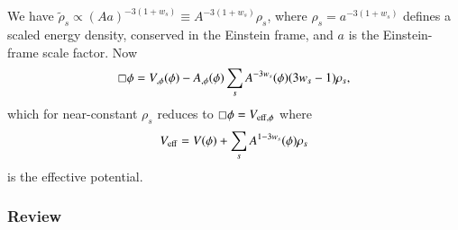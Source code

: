     We have $\widetilde{\rho}_s\propto (Aa)^{-3(1+w_s)} \equiv A^{-3(1+w_s)}\rho_s$, where $\rho_s=a^{-3(1+w_s)}$ defines a scaled energy density, conserved in the Einstein frame, and $a$ is the Einstein-frame scale factor. Now
    \begin{equation}
        \sq \phi = V_{,\phi}(\phi) - A_{,\phi}(\phi) \sum_{s} A^{-3w_s}(\phi) (3w_s-1)\rho_s,
    \end{equation}
    which for near-constant $\rho_s$ reduces to $\sq \phi = V_{\mathrm{eff},\phi}$ where~\citep{hinterbichlerSymmetronCosmology2011}
    \begin{equation}
        V_\mathrm{eff} = V(\phi) + \sum_s A^{1-3w_s}(\phi) \rho_s
    \end{equation}
    is the effective potential.%

    


    \subsubsection{Review}

